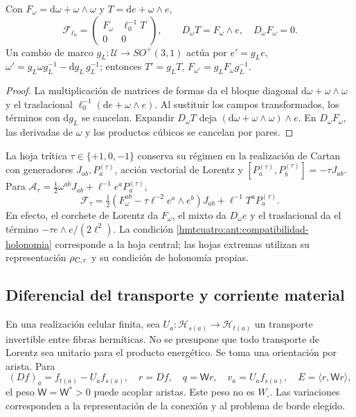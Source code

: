 \begin{proposition}
\label{hmtcuatro:ant:curvatura}
Con \(F_\omega=\mathrm d\omega+\omega\wedge\omega\) y
\(T=\mathrm de+\omega\wedge e\),
\[
 \mathcal F_{\ell_0}=
 \begin{pmatrix}F_\omega&\ell_0^{-1}T\\0&0\end{pmatrix},
 \qquad D_\omega T=F_\omega\wedge e,\quad D_\omega F_\omega=0 .
\]
Un cambio de marco \(g_L:\mathcal U\to SO^+(3,1)\) actúa por
\(e'=g_Le\),
\(\omega'=g_L\omega g_L^{-1}-\mathrm dg_L\,g_L^{-1}\);
entonces \(T'=g_LT\), \(F_{\omega'}=g_LF_\omega g_L^{-1}\).
\end{proposition}
\begin{proof}
La multiplicación de matrices de formas da el bloque diagonal
\(\mathrm d\omega+\omega\wedge\omega\) y el traslacional
\(\ell_0^{-1}(\mathrm de+\omega\wedge e)\). Al sustituir los
campos transformados, los términos con \(\mathrm dg_L\) se
cancelan. Expandir \(D_\omega T\) deja
\((\mathrm d\omega+\omega\wedge\omega)\wedge e\).
En \(D_\omega F_\omega\), las derivadas de \(\omega\) y los
productos cúbicos se cancelan por pares.
\end{proof}

La hoja trítica \(\tau\in\{+1,0,-1\}\) conserva su régimen en la
realización de Cartan con generadores \(J_{ab},P_a^{(\tau)}\),
acción vectorial de Lorentz y
\([P_a^{(\tau)},P_b^{(\tau)}]=-\tau J_{ab}\). Para
\(\mathcal A_\tau=\frac12\omega^{ab}J_{ab}+\ell^{-1}e^aP_a^{(\tau)}\),
\[
 \mathcal F_\tau=
 \tfrac12(F_\omega^{ab}-\tau\ell^{-2}e^a\wedge e^b)J_{ab}
 +\ell^{-1}T^aP_a^{(\tau)} .
\]
En efecto, el corchete de Lorentz da \(F_\omega\), el mixto
da \(D_\omega e\) y el traslacional da el término
\(-\tau e\wedge e/(2\ell^2)\). La condición
\eqref{hmtcuatro:ant:compatibilidad-holonomia} corresponde a la
hoja central; las hojas extremas utilizan su representación
\(\rho_{{\rm C},\tau}\) y su condición de holonomía propias.

\subsection{Diferencial del transporte y corriente material}
\label{hmtcuatro:ant:corriente-transporte}

En una realización celular finita, sea
\(U_a:\mathcal H_{s(a)}\to\mathcal H_{t(a)}\) un transporte
invertible entre fibras hermíticas. No se presupone que todo
transporte de Lorentz sea unitario para el producto energético.
Se toma una orientación por arista. Para
\[
 (Df)_a=f_{t(a)}-U_af_{s(a)},\quad r=Df,\quad
 q=\mathsf W r,\quad v_a=U_af_{s(a)},\quad
 E=\langle r,\mathsf W r\rangle ,
\]
el peso \(\mathsf W=\mathsf W^*>0\) puede acoplar aristas.
Este peso no es \(W_\square\). Las variaciones corresponden a
la representación de la conexión y al problema de borde elegido.

